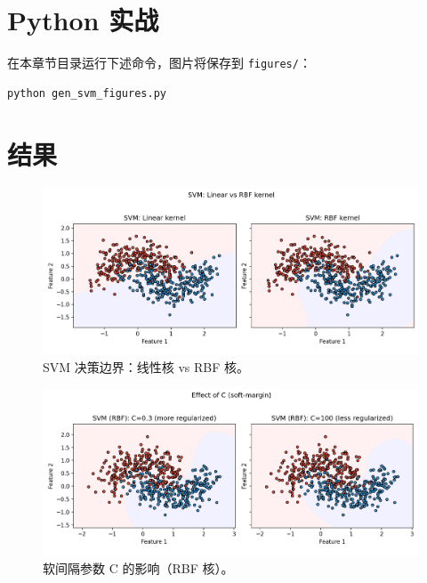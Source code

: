 \documentclass[UTF8,zihao=-4]{ctexart}
\begin{document}
\section{Python 实战}
在本章节目录运行下述命令，图片将保存到 \texttt{figures/}：
\begin{lstlisting}[style=code,caption={生成 SVM 配图},label={lst:genfigs_svm_cn}]
python gen_svm_figures.py
\end{lstlisting}



\section{结果}
\begin{figure}[H]
  \centering
  \includegraphics[width=0.95\linewidth]{svm_linear_vs_rbf.png}
  \caption{SVM 决策边界：线性核 vs RBF 核。}
  \label{fig:svm_lin_rbf_cn}
\end{figure}
\FloatBarrier

\begin{figure}[H]
  \centering
  \includegraphics[width=0.95\linewidth]{svm_C_compare.png}
  \caption{软间隔参数 C 的影响（RBF 核）。}
  \label{fig:svm_c_cn}
\end{figure}
\FloatBarrier
\end{document}
